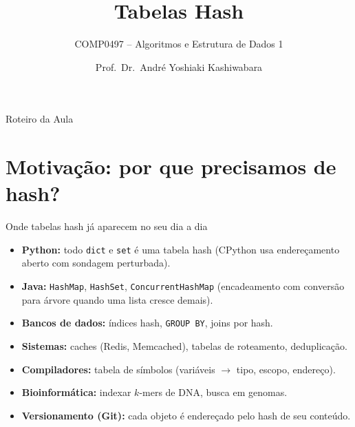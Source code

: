 \documentclass[aspectratio=169]{beamer}
\title{Tabelas Hash}
\subtitle{COMP0497 -- Algoritmos e Estrutura de Dados 1}
\author{Prof.\ Dr.\ André Yoshiaki Kashiwabara}
\date{}
\begin{document}

\begin{frame}
  \titlepage
\end{frame}

\begin{frame}{Roteiro da Aula}
\tableofcontents
\end{frame}

\section{Motivação: por que precisamos de hash?}

\begin{frame}{Onde tabelas hash já aparecem no seu dia a dia}
\begin{itemize}
\item \textbf{Python:} todo \texttt{dict} e \texttt{set} é uma tabela hash (CPython usa endereçamento aberto com sondagem perturbada).
\item \textbf{Java:} \texttt{HashMap}, \texttt{HashSet}, \texttt{ConcurrentHashMap} (encadeamento com conversão para árvore quando uma lista cresce demais).
\item \textbf{Bancos de dados:} índices hash, \texttt{GROUP BY}, joins por hash.
\item \textbf{Sistemas:} caches (Redis, Memcached), tabelas de roteamento, deduplicação.
\item \textbf{Compiladores:} tabela de símbolos (variáveis $\to$ tipo, escopo, endereço).
\item \textbf{Bioinformática:} indexar $k$-mers de DNA, busca em genomas.
\item \textbf{Versionamento (Git):} cada objeto é endereçado pelo hash de seu conteúdo.
\end{itemize}
\end{frame}
\end{document}
